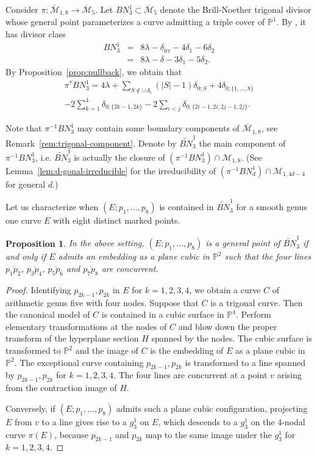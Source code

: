 \documentclass[11]{amsart}
\theoremstyle{plain}
\newtheorem{proposition}[theorem]{Proposition}
\theoremstyle{definition}
\newcommand{\MM}{\mathcal M}
\newcommand{\BM}{\overline{\mathcal M}}
\newcommand{\wt}{\widetilde}
\newcommand{\irr}{\operatorname{irr}}
\newcommand{\bbP}{\mathbb P}
\begin{document}
Consider  $\pi: \BM_{1,8}\to \BM_5$. Let $BN^1_3\subset \BM_5$ denote the Brill-Noether trigonal divisor whose general point parameterizes a curve admitting a triple cover of $\bbP^1$. 
By \cite{HarrisMumfordKodaira}, it has divisor class  
\begin{eqnarray*}
BN^1_3 & = & 8 \lambda - \delta_{\irr} - 4\delta_1 - 6 \delta_2 \\
       & = & 8 \lambda - \delta - 3\delta_1 - 5 \delta_2.   
\end{eqnarray*}
By Proposition~\ref{prop:pullback}, we obtain that  
\begin{eqnarray}
\label{eqn:trigonal}
\pi^{*}BN^1_3  =  4\lambda + \sum_{S\not\in \cup \Lambda_i} (|S| - 1)\delta_{0;S} + 4 \delta_{0; \{1, \ldots, 8\}}  \\
  - 2\sum_{k=1}^4 \delta_{0; \{2k-1, 2k \}} - 2\sum_{i<j}  \delta_{0; \{2i-1, 2i, 2j-1, 2j \}} \nonumber. 
\end{eqnarray}

Note that $\pi^{-1}BN^1_3$ may contain some boundary components of $\BM_{1,8}$, see Remark~\ref{rem:trigonal-component}. Denote by $\wt{BN}^1_3$ the main component of $\pi^{-1}BN^1_3$, i.e. 
$\wt{BN}^1_3$ is actually the closure of $(\pi^{-1}BN^1_3)\cap \MM_{1,8}$. (See Lemma~\ref{lem:d-gonal-irreducible} 
for the irreducibility of $(\pi^{-1}BN^1_d)\cap \MM_{1,4d-4}$ for general $d$.) 

Let us characterize when $(E; p_1,\ldots, p_8)$ is contained 
in $\wt{BN}^1_3$ for a smooth genus one curve $E$ with eight distinct marked points. 

\begin{proposition}
\label{prop:trigonal-geometry}
In the above setting, $(E; p_1,\ldots, p_8)$ is a general point of $\wt{BN}^1_3$ if and only if $E$ admits an embedding as a plane cubic in $\bbP^2$ such that the four lines 
$\overline{p_{1}p_{2}}$, $\overline{p_{3}p_{4}}$, $\overline{p_{5}p_{6}}$ and $\overline{p_{7}p_{8}}$ are concurrent. 
\end{proposition}

\begin{proof}
Identifying $p_{2k-1}, p_{2k}$ in $E$ for $k = 1, 2, 3, 4$, we obtain a curve $C$ of arithmetic genus five with four nodes. 
Suppose that $C$ is a trigonal curve. Then the canonical model of $C$ is contained in a cubic surface in $\bbP^4$. Perform elementary transformations at the nodes of $C$ and blow down the proper transform of the hyperplane section $H$ spanned by the nodes. The cubic surface is transformed to $\bbP^2$ and the image of $C$ is  
the embedding of $E$ as a plane cubic in $\bbP^2$. The exceptional curve containing $p_{2k-1}, p_{2k}$ is transformed to a line spanned by $p_{2k-1}, p_{2k}$ 
for $k = 1, 2, 3, 4$. The four lines are concurrent at a point $v$ arising from the contraction image of $H$. 

Conversely, if $(E; p_1, \ldots, p_8)$ admits such a plane cubic configuration, 
projecting $E$ from $v$ to a line gives rise to a $g^1_3$ on $E$, which descends to a $g^1_3$ on the $4$-nodal curve $\pi(E)$, because $p_{2k-1}$ and $p_{2k}$ map to the same image under the $g^1_3$ for $k=1,2,3,4$. 
\end{proof}
\end{document}
